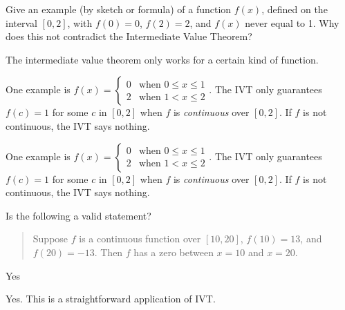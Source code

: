 \begin{Mquestion}
Give an example (by sketch or formula) of a function $f(x)$, defined on the interval $[0,2]$, with $f(0)=0$, $f(2)=2$, and $f(x)$ never equal to 1. Why does this not contradict the Intermediate Value Theorem?
\end{Mquestion}
\begin{hint} The intermediate value theorem only works for a certain kind of function.
\end{hint}
\begin{answer} One example is $f(x) = \left\{  \begin{array}{ll}
0&\mbox{when }0 \leq x \leq 1\\
2&\mbox{when }1<x \leq 2
\end{array}\right.$. The IVT only guarantees $f(c)=1$ for some $c$ in $[0,2]$ when $f$ is \emph{continuous} over $[0,2]$. If $f$ is not continuous, the IVT says nothing.
\begin{center}
\end{center}
\end{answer}
\begin{solution} One example is $f(x) = \left\{  \begin{array}{ll}
0&\mbox{when }0 \leq x \leq 1\\
2&\mbox{when }1<x \leq 2
\end{array}\right.$. The IVT only guarantees $f(c)=1$ for some $c$ in $[0,2]$ when $f$ is \emph{continuous} over $[0,2]$. If $f$ is not continuous, the IVT says nothing.
\begin{center}
\end{center}
\end{solution}


\begin{Mquestion} Is the following a valid statement?
\begin{quote}Suppose $f$ is a continuous function over $[10,20]$, $f(10)=13$, and $f(20)=-13$. Then $f$ has a zero between $x=10$ and $x=20$.\end{quote}
\end{Mquestion}
\begin{answer} Yes
\end{answer}
\begin{solution} Yes. This is a straightforward application of IVT.
\end{solution}

